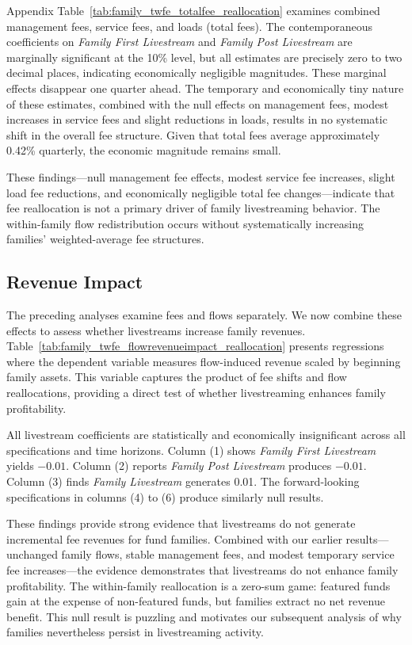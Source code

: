 \documentclass[12pt]{article}
\begin{document}
Appendix Table~\ref{tab:family_twfe_totalfee_reallocation} examines combined management fees, service fees, and loads (total fees). The contemporaneous coefficients on \textit{Family First Livestream} and \textit{Family Post Livestream} are marginally significant at the 10\% level, but all estimates are precisely zero to two decimal places, indicating economically negligible magnitudes. These marginal effects disappear one quarter ahead. The temporary and economically tiny nature of these estimates, combined with the null effects on management fees, modest increases in service fees and slight reductions in loads, results in no systematic shift in the overall fee structure. Given that total fees average approximately 0.42\% quarterly, the economic magnitude remains small.

These findings---null management fee effects, modest service fee increases, slight load fee reductions, and economically negligible total fee changes---indicate that fee reallocation is not a primary driver of family livestreaming behavior. The within-family flow redistribution occurs without systematically increasing families' weighted-average fee structures.

\subsection{Revenue Impact}\label{subsec:revenue_impact}

The preceding analyses examine fees and flows separately. We now combine these effects to assess whether livestreams increase family revenues. Table~\ref{tab:family_twfe_flowrevenueimpact_reallocation} presents regressions where the dependent variable measures flow-induced revenue scaled by beginning family assets. This variable captures the product of fee shifts and flow reallocations, providing a direct test of whether livestreaming enhances family profitability.

All livestream coefficients are statistically and economically insignificant across all specifications and time horizons. Column (1) shows \textit{Family First Livestream} yields $-0.01$. Column (2) reports \textit{Family Post Livestream} produces $-0.01$. Column (3) finds \textit{Family Livestream} generates 0.01. The forward-looking specifications in columns (4) to (6) produce similarly null results.

These findings provide strong evidence that livestreams do not generate incremental fee revenues for fund families. Combined with our earlier results—unchanged family flows, stable management fees, and modest temporary service fee increases—the evidence demonstrates that livestreams do not enhance family profitability. The within-family reallocation is a zero-sum game: featured funds gain at the expense of non-featured funds, but families extract no net revenue benefit. This null result is puzzling and motivates our subsequent analysis of why families nevertheless persist in livestreaming activity.
\end{document}
